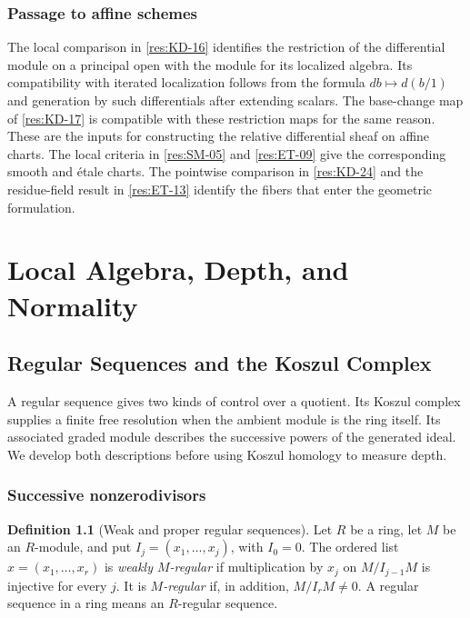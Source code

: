 \documentclass[11pt,oneside,openany]{book}
\theoremstyle{definition}
\newtheorem{definition}[theorem]{Definition}
\theoremstyle{remark}
\begin{document}
\section*{Passage to affine schemes}

The local comparison in \ref{res:KD-16} identifies the restriction
of the differential module on a principal open with the module
for its localized algebra. Its compatibility with iterated
localization follows from the formula $db\mapsto d(b/1)$ and
generation by such differentials after extending scalars.
The base-change map of \ref{res:KD-17} is compatible with these
restriction maps for the same reason. These are the inputs for
constructing the relative differential sheaf on affine charts.
The local criteria in \ref{res:SM-05} and \ref{res:ET-09} give
the corresponding smooth and \'{e}tale charts. The pointwise
comparison in \ref{res:KD-24} and the residue-field result in
\ref{res:ET-13} identify the fibers that enter the geometric
formulation.

\part{Local Algebra, Depth, and Normality}
\label{part:local}
\chapter{Regular Sequences and the Koszul Complex}\label{ch:regular-koszul}

A regular sequence gives two kinds of control over a quotient. Its Koszul
complex supplies a finite free resolution when the ambient module is the
ring itself. Its associated graded module describes the successive powers
of the generated ideal. We develop both descriptions before using Koszul
homology to measure depth.

\section{Successive nonzerodivisors}

\begin{definition}[Weak and proper regular sequences]\label{res:RK-01}
Let $R$ be a ring, let $M$ be an $R$-module, and put $I_j=(x_1,\ldots,x_j)$,
with $I_0=0$. The ordered list $x=(x_1,\ldots,x_r)$ is
\emph{weakly $M$-regular} if multiplication by $x_j$ on
$M/I_{j-1}M$ is injective for every $j$. It is \emph{$M$-regular} if,
in addition, $M/I_rM\ne0$. A regular sequence in a ring means an
$R$-regular sequence.
\end{definition}
\end{document}
